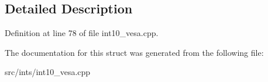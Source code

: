 \subsection{Detailed Description}


Definition at line 78 of file int10\-\_\-vesa.\-cpp.



The documentation for this struct was generated from the following file\-:\begin{DoxyCompactItemize}
\item 
src/ints/int10\-\_\-vesa.\-cpp\end{DoxyCompactItemize}
